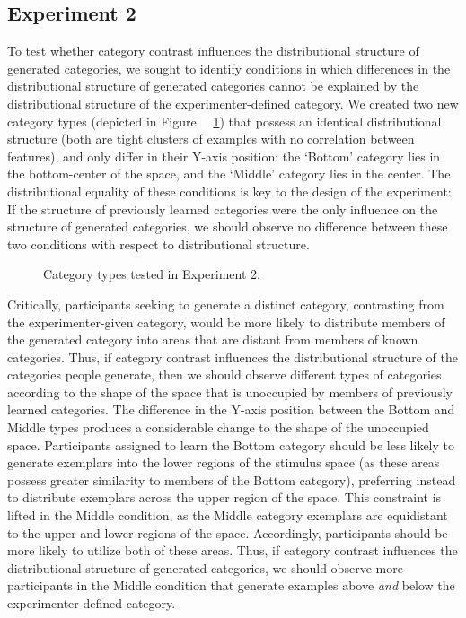 \documentclass[12pt]{article}
\begin{document}
\begin{flushleft}
\section{Experiment 2}

To test whether category contrast influences the distributional structure of generated categories, we sought to identify conditions in which differences in the distributional structure of generated categories cannot be explained by the distributional structure of the experimenter-defined category. We created two new category types (depicted in Figure ~~\ref{fig:e2-conditions}) that possess an identical distributional structure (both are tight clusters of examples with no correlation between features), and only differ in their Y-axis position: the `Bottom' category lies in the bottom-center of the space, and the `Middle' category lies in the center. The distributional equality of these conditions is key to the design of the experiment: If the structure of previously learned categories were the only influence on the structure of generated categories, we should observe no difference between these two conditions with respect to distributional structure.

\begin{figure}
    \begin{center}
    
    \caption{Category types tested in Experiment 2.}
    \label{fig:e2-conditions}
    \end{center}
\end{figure}

Critically, participants seeking to generate a distinct category, contrasting from the experimenter-given category, would be more likely to distribute members of the generated category into areas that are distant from members of known categories. Thus, if category contrast influences the distributional structure of the categories people generate, then we should observe different types of categories according to the shape of the space that is unoccupied by members of previously learned categories. The difference in the Y-axis position between the Bottom and Middle types produces a considerable change to the shape of the unoccupied space. Participants assigned to learn the Bottom category should be less likely to generate exemplars into the lower regions of the stimulus space (as these areas possess greater similarity to members of the Bottom category), preferring instead to distribute exemplars across the upper region of the space. This constraint is lifted in the Middle condition, as the Middle category exemplars are equidistant to the upper and lower regions of the space. Accordingly, participants should be more likely to utilize both of these areas. Thus, if category contrast influences the distributional structure of generated categories, we should observe more participants in the Middle condition that generate examples above {\em and} below the experimenter-defined category.


\end{flushleft}
\end{document}
